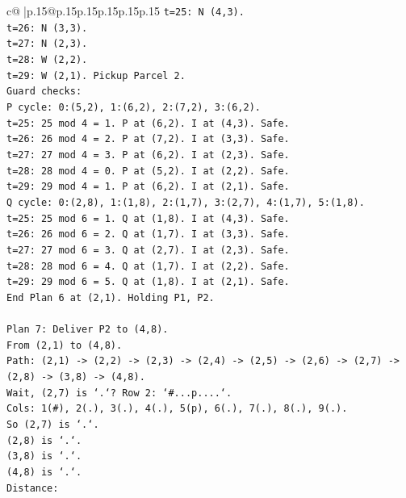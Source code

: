 \documentclass{article}
\begin{document}
{\begin{supertabular}{c@{$\;$}|p{.15\linewidth}@{}p{.15\linewidth}p{.15\linewidth}p{.15\linewidth}p{.15\linewidth}p{.15\linewidth}}
{{{\texttt{t=25: N (4,3).} \\
\texttt{t=26: N (3,3).} \\
\texttt{t=27: N (2,3).} \\
\texttt{t=28: W (2,2).} \\
\texttt{t=29: W (2,1). Pickup Parcel 2.} \\
\texttt{Guard checks:} \\
\texttt{P cycle: 0:(5,2), 1:(6,2), 2:(7,2), 3:(6,2).} \\
\texttt{t=25: 25 mod 4 = 1. P at (6,2). I at (4,3). Safe.} \\
\texttt{t=26: 26 mod 4 = 2. P at (7,2). I at (3,3). Safe.} \\
\texttt{t=27: 27 mod 4 = 3. P at (6,2). I at (2,3). Safe.} \\
\texttt{t=28: 28 mod 4 = 0. P at (5,2). I at (2,2). Safe.} \\
\texttt{t=29: 29 mod 4 = 1. P at (6,2). I at (2,1). Safe.} \\
\texttt{Q cycle: 0:(2,8), 1:(1,8), 2:(1,7), 3:(2,7), 4:(1,7), 5:(1,8).} \\
\texttt{t=25: 25 mod 6 = 1. Q at (1,8). I at (4,3). Safe.} \\
\texttt{t=26: 26 mod 6 = 2. Q at (1,7). I at (3,3). Safe.} \\
\texttt{t=27: 27 mod 6 = 3. Q at (2,7). I at (2,3). Safe.} \\
\texttt{t=28: 28 mod 6 = 4. Q at (1,7). I at (2,2). Safe.} \\
\texttt{t=29: 29 mod 6 = 5. Q at (1,8). I at (2,1). Safe.} \\
\texttt{End Plan 6 at (2,1). Holding P1, P2.} \\
\\ 
\texttt{Plan 7: Deliver P2 to (4,8).} \\
\texttt{From (2,1) to (4,8).} \\
\texttt{Path: (2,1) {-}> (2,2) {-}> (2,3) {-}> (2,4) {-}> (2,5) {-}> (2,6) {-}> (2,7) {-}> (2,8) {-}> (3,8) {-}> (4,8).} \\
\texttt{Wait, (2,7) is `.`? Row 2: `\#...p....`.} \\
\texttt{Cols: 1(\#), 2(.), 3(.), 4(.), 5(p), 6(.), 7(.), 8(.), 9(.).} \\
\texttt{So (2,7) is `.`.} \\
\texttt{(2,8) is `.`.} \\
\texttt{(3,8) is `.`.} \\
\texttt{(4,8) is `.`.} \\
\texttt{Distance:} \\
}}}
\end{supertabular}}
\end{document}
